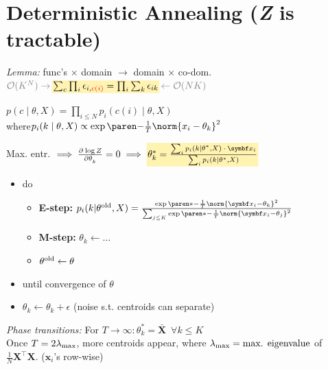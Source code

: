\section{Deterministic Annealing
\hfill\mdseries (\textit{\rmfamily Z} is tractable)}

\emph{Lemma:}\enspace
func's $\times$ domain $\to$ domain $\times$ co-dom.\\
\quad $\textcolor{gray}{\mathcal O(K^N) \rightarrow\,}
\highlight*{\sum_c \prod_i \epsilon_{i, \color{red} c(i)} = \prod_i \sum_k \epsilon_{ik}}
\textcolor{gray}{\,\leftarrow \mathcal O(NK)}$

$p(c\mid \theta, X) = \prod_{i\leq N} p_i(c(i) \mid \theta,X)$\\
\quad where\enskip $p_i(k\mid \theta, X) \propto \exp(-\frac1T \norm{x_i - \theta_k}^2)$

Max. entr.
$\implies \pderiv{\log Z}{\theta_k} = 0
\implies \highlight*{\theta_k^\ast = \frac{ \sum_i p_i(k\mid \theta^\ast, X) \:\cdot\: \symbf x_i }{ \sum_i p_i(k\mid \theta^\ast, X) }}$

\begin{highlightbox}
\begin{itemize}
    \item[] do
    \begin{itemize}
        \item[]
            \vspace{-5pt}
            \textbf{E-step:\;} $p_i(k\vert \theta\ap{old}, X) = \frac{\exp\paren*{ -\frac1T \norm{\symbf x_i - \theta_k}^2 }}{\sum_{j\leq K} \exp\paren*{ -\frac1T \norm{\symbf x_i - \theta_j }^2}}$
            \vspace{-5pt}
        \item[] \textbf{M-step:} $\theta_k \leftarrow \ldots$
        \item[] $\theta^\mathrm{old} \leftarrow \theta$
    \end{itemize}
    \item[] until convergence of $\theta$
    \item[] $\theta_k \leftarrow \theta_k + \epsilon$
        {\small\enspace\gray (noise s.t. centroids can separate)}
\end{itemize}
\end{highlightbox}

\emph{Phase transitions:}\enspace
For $T \to \infty\colon \theta_k^\ast = \bar{\symbf X} \enspace \forall k\leq K$\\
Once $T = 2\lambda_\mathrm{max}$, more centroids appear, where $\lambda_\mathrm{max} = \textrm{max. eigenvalue}$ of $\frac1N \symbf X^\top \symbf X$.
\enspace($\symbf x_i$'s row-wise)
